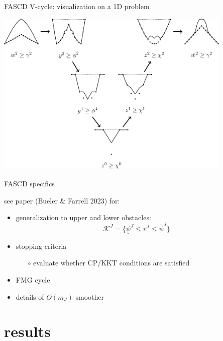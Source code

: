 \documentclass[svgnames,
               hyperref={colorlinks,citecolor=DeepPink4,linkcolor=FireBrick,urlcolor=Maroon},
               usepdftitle=false]  %
               {beamer}
\begin{document}
\begin{frame}{FASCD V-cycle: visualization on a 1D problem}

\centering
\includegraphics[width=0.85\textwidth]{../talk-dms/figs/vcycle-visualized.png}
\end{frame}


\begin{frame}{FASCD specifics}

see paper (Bueler \& Farrell 2023) for:
\begin{itemize}
\item generalization to upper and lower obstacles:
    $$\mathcal{K}^J = \{\underline{\psi}^J \le v^J \le \overline{\psi}^J\}$$
\item stopping criteria
    \begin{itemize}
    \item[$\circ$] evaluate whether CP/KKT conditions are satisfied
    \end{itemize}
\item FMG cycle
\item details of $O(m_J)$ smoother
\end{itemize}
\end{frame}


\section{results}
\end{document}
